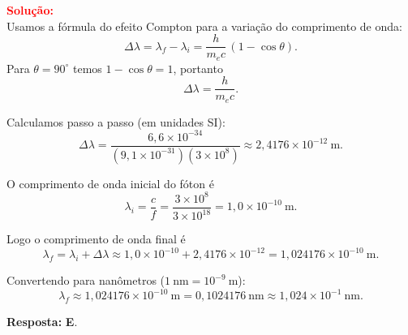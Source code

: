 \begin{flushleft}
\vspace{0.5cm}

\textcolor{red}{\textbf{Solução:}}\\

Usamos a fórmula do efeito Compton para a variação do comprimento de onda:
\[
\Delta\lambda=\lambda_f-\lambda_i=\frac{h}{m_e c}\,(1-\cos\theta).
\]
Para $\theta=90^\circ$ temos $1-\cos\theta=1$, portanto
\[
\Delta\lambda=\frac{h}{m_e c}.
\]

Calculamos passo a passo (em unidades SI):
\[
\Delta\lambda=\frac{6{,}6\times10^{-34}}{(9{,}1\times10^{-31})(3\times10^{8})}
\approx 2{,}4176\times10^{-12}\ \mathrm{m}.
\]

O comprimento de onda inicial do fóton é
\[
\lambda_i=\frac{c}{f}=\frac{3\times10^{8}}{3\times10^{18}}=1{,}0\times10^{-10}\ \mathrm{m}.
\]

Logo o comprimento de onda final é
\[
\lambda_f=\lambda_i+\Delta\lambda
\approx 1{,}0\times10^{-10} + 2{,}4176\times10^{-12}
=1{,}024176\times10^{-10}\ \mathrm{m}.
\]

Convertendo para nanômetros ($1\ \mathrm{nm}=10^{-9}\ \mathrm{m}$):
\[
\lambda_f \approx 1{,}024176\times10^{-10}\ \mathrm{m}
=0{,}1024176\ \mathrm{nm}\approx 1{,}024\times10^{-1}\ \mathrm{nm}.
\]

\vspace{0.3cm}
\textbf{Resposta:} \colorbox{green!50}{\textbf{E}}.

\end{flushleft}





